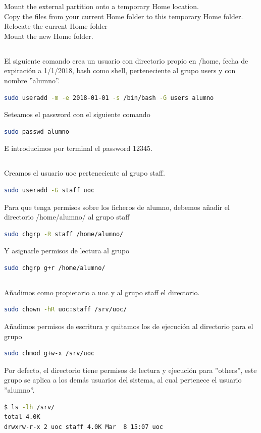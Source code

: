 \documentclass[10pt,a4paper]{article}
\begin{document}
Mount the external partition onto a temporary Home location.\\
Copy the files from your current Home folder to this temporary Home folder.\\
Relocate the current Home folder\\
Mount the new Home folder.
\subsection{}
El siguiente comando crea un usuario con directorio propio en /home, fecha de expiración a 1/1/2018, bash como shell, perteneciente al grupo users y con nombre ''alumno''.
\begin{lstlisting}[language=bash]
sudo useradd -m -e 2018-01-01 -s /bin/bash -G users alumno
\end{lstlisting}
Seteamos el password con el siguiente comando
\begin{lstlisting}[language=bash]
sudo passwd alumno
\end{lstlisting}
E introducimos por terminal el password 12345.
\subsection{}
Creamos el usuario uoc perteneciente al grupo staff.
\begin{lstlisting}[language=bash]
sudo useradd -G staff uoc
\end{lstlisting}
Para que tenga permisos sobre los ficheros de alumno, debemos añadir el directorio /home/alumno/ al grupo staff
\begin{lstlisting}[language=bash]
sudo chgrp -R staff /home/alumno/
\end{lstlisting}
Y asignarle permisos de lectura al grupo
\begin{lstlisting}[language=bash]
sudo chgrp g+r /home/alumno/
\end{lstlisting}
\subsection{}
Añadimos como propietario a uoc y al grupo staff el directorio.
\begin{lstlisting}[language=bash]
sudo chown -hR uoc:staff /srv/uoc/
\end{lstlisting}
Añadimos permisos de escritura y quitamos los de ejecución al directorio para el grupo
\begin{lstlisting}[language=bash]
sudo chmod g+w-x /srv/uoc
\end{lstlisting}
Por defecto, el directorio tiene permisos de lectura y ejecución para ''others'', este grupo se aplica a los demás usuarios del sistema, al cual pertenece el usuario ''alumno''.
\begin{lstlisting}[language=bash]
$ ls -lh /srv/
total 4.0K
drwxrw-r-x 2 uoc staff 4.0K Mar  8 15:07 uoc
\end{lstlisting}
\end{document}
